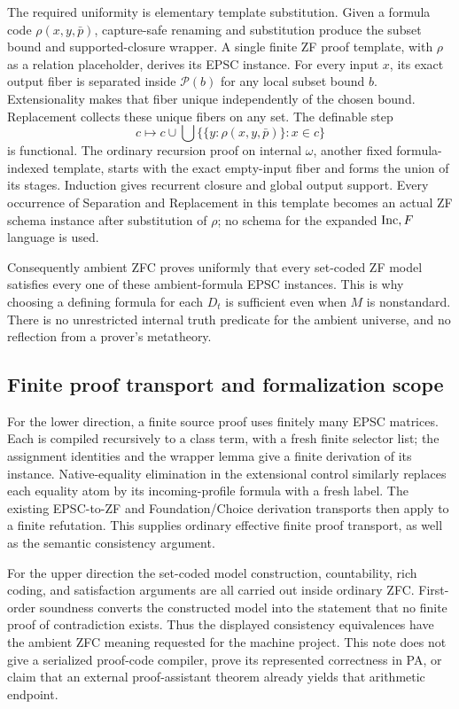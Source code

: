 \documentclass[11pt]{article}
\newcommand{\Inc}{\mathop{\rm Inc}}
\begin{document}
The required uniformity is elementary template substitution.  Given a
formula code $\rho(x,y,\bar p)$, capture-safe renaming and substitution
produce the subset bound and supported-closure wrapper.  A single finite
ZF proof template, with $\rho$ as a relation placeholder, derives its EPSC
instance.  For every input $x$, its exact output fiber is separated inside
$\mathcal P(b)$ for any local subset bound $b$.  Extensionality makes that
fiber unique independently of the chosen bound.  Replacement collects
these unique fibers on any set.  The definable step
\[
 c\longmapsto c\cup\bigcup\{\{y:\rho(x,y,\bar p)\}:x\in c\}
\]
is functional.  The ordinary recursion proof on internal $\omega$, another
fixed formula-indexed template, starts with the exact empty-input fiber
and forms the union of its stages.  Induction gives recurrent closure
and global output support.  Every occurrence of Separation and
Replacement in this template becomes an actual ZF schema instance after
substitution of $\rho$; no schema for the expanded $\Inc,F$ language is used.

Consequently ambient ZFC proves uniformly that every set-coded ZF model
satisfies every one of these ambient-formula EPSC instances.  This is why
choosing a defining formula for each $D_t$ is sufficient even when $M$
is nonstandard.  There is no unrestricted internal truth predicate for
the ambient universe, and no reflection from a prover's metatheory.

\subsection*{Finite proof transport and formalization scope}

For the lower direction, a finite source proof uses finitely many EPSC
matrices.  Each is compiled recursively to a class term, with a fresh
finite selector list; the assignment identities and the wrapper lemma
give a finite derivation of its instance.  Native-equality elimination
in the extensional control similarly replaces each equality atom by its
incoming-profile formula with a fresh label.  The existing EPSC-to-ZF
and Foundation/Choice derivation transports then apply to a finite
refutation.  This supplies ordinary effective finite proof transport,
as well as the semantic consistency argument.

For the upper direction the set-coded model construction, countability,
rich coding, and satisfaction arguments are all carried out inside
ordinary ZFC.  First-order soundness converts the constructed model into
the statement that no finite proof of contradiction exists.  Thus the
displayed consistency equivalences have the ambient ZFC meaning requested
for the machine project.  This note does not give a serialized proof-code
compiler, prove its represented correctness in PA, or claim that an
external proof-assistant theorem already yields that arithmetic endpoint.
\end{document}

